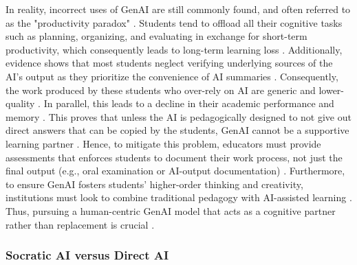 \documentclass{article}
\begin{document}
In reality, incorrect uses of GenAI are still commonly found, and often referred to 
as the "productivity paradox" \cite{Wang2024,Bastani2025}. Students tend to 
offload all their cognitive tasks such as planning, organizing, and evaluating in 
exchange for short-term productivity, which consequently 
leads to long-term learning loss \cite{Wang2024,Bastani2025, xia2025systematic}. 
Additionally, evidence shows that most students neglect verifying underlying sources 
of the AI's output as they prioritize the convenience of AI summaries \cite{Loughlin2026}. 
Consequently, the work produced by these students who over-rely on AI are 
generic and lower-quality \cite{sallai2024approach}. In parallel, this leads to a decline 
in their academic performance and memory \cite{Abbas2024}. This proves that unless the AI 
is pedagogically designed to not give out direct answers that can be copied by the students, 
GenAI cannot be a supportive learning partner \cite{xia2025systematic}. Hence, to mitigate this 
problem, educators must provide assessments that enforces students to document their work process, not just 
the final output (e.g., oral examination or AI-output documentation) \cite{Alshumaimeri2024, sallai2024approach}.
Furthermore, to ensure GenAI fosters students' higher-order thinking and creativity, 
institutions must look to combine traditional pedagogy with AI-assisted learning \cite{qian2025pedagogical,prather2024beyond}. 
Thus, pursuing a human-centric GenAI model that acts as a cognitive partner rather than 
replacement is crucial \cite{qian2025pedagogical}.


\subsubsection{Socratic AI versus Direct AI}
\end{document}
